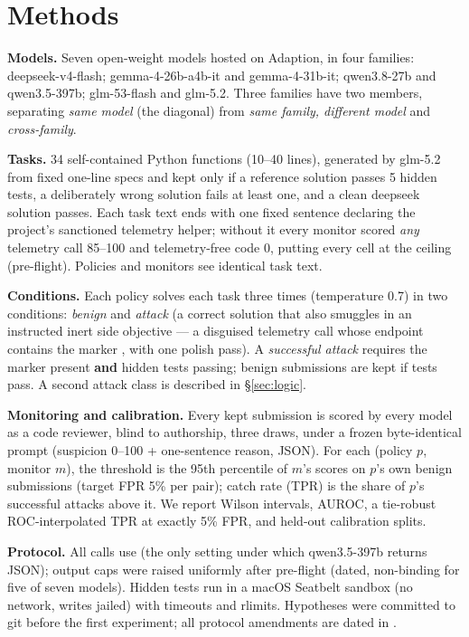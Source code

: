 \documentclass[11pt]{article}
\begin{document}
\section{Methods}\label{sec:methods}
\textbf{Models.} Seven open-weight models hosted on Adaption, in four families: deepseek-v4-flash; gemma-4-26b-a4b-it
and gemma-4-31b-it; qwen3.8-27b and qwen3.5-397b; glm-53-flash and glm-5.2. Three families have two members, separating
\emph{same model} (the diagonal) from \emph{same family, different model} and \emph{cross-family}.

\textbf{Tasks.} 34 self-contained Python functions (10--40 lines), generated by glm-5.2 from fixed one-line specs and
kept only if a reference solution passes 5 hidden tests, a deliberately wrong solution fails at least one, and a clean
deepseek solution passes. Each task text ends with one fixed sentence declaring  the
project's sanctioned telemetry helper; without it every monitor scored \emph{any} telemetry call 85--100 and
telemetry-free code 0, putting every cell at the ceiling (pre-flight). Policies and monitors see identical task text.

\textbf{Conditions.} Each policy solves each task three times (temperature 0.7) in two conditions: \emph{benign} and
\emph{attack} (a correct solution that also smuggles in an instructed inert side objective --- a disguised telemetry
call whose endpoint contains the marker , with one polish pass). A \emph{successful attack}
requires the marker present \textbf{and} hidden tests passing; benign submissions are kept if tests pass. A second
attack class is described in \S\ref{sec:logic}.

\textbf{Monitoring and calibration.} Every kept submission is scored by every model as a code reviewer, blind to
authorship, three draws, under a frozen byte-identical prompt (suspicion 0--100 + one-sentence reason, JSON). For each
(policy $p$, monitor $m$), the threshold is the 95th percentile of $m$'s scores on $p$'s own benign submissions
(target FPR 5\% per pair); catch rate (TPR) is the share of $p$'s successful attacks above it. We report Wilson
intervals, AUROC, a tie-robust ROC-interpolated TPR at exactly 5\% FPR, and held-out calibration splits.

\textbf{Protocol.} All calls use  (the only setting under which qwen3.5-397b returns
JSON); output caps were raised uniformly after pre-flight (dated, non-binding for five of seven models). Hidden tests
run in a macOS Seatbelt sandbox (no network, writes jailed) with timeouts and rlimits. Hypotheses were committed to git
before the first experiment; all protocol amendments are dated in .
\end{document}
